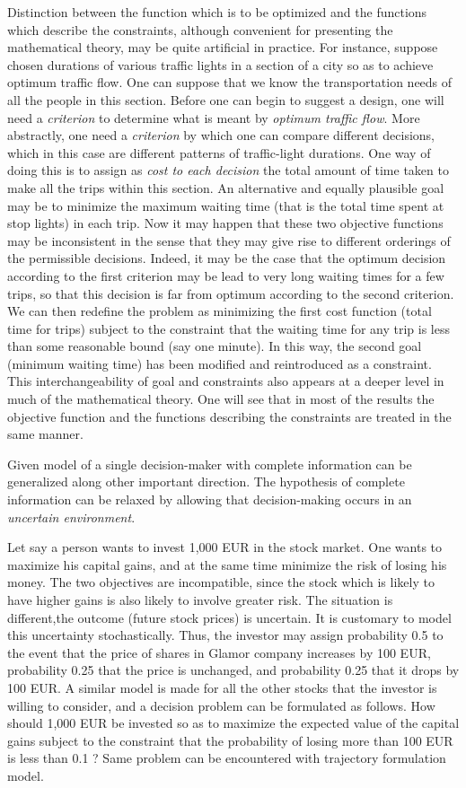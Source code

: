 \noindent Distinction between the function which is to be optimized and the functions which describe the constraints, although convenient for presenting the mathematical theory, may be quite artificial in practice. For instance, suppose chosen durations of various traffic lights in a section of a city so as to achieve optimum traffic flow. One can suppose that we know the transportation needs of all the people in this section. Before one can begin to suggest a design, one will need a \textit{criterion} to determine what is meant by \textit{optimum traffic flow}. More abstractly, one need a \textit{criterion} by which one can compare different decisions, which in this case are different patterns of traffic-light durations. One way of doing this is to assign as \textit{cost to each decision} the total amount of time taken to make all the trips within this section. An alternative and equally plausible goal may be to minimize the maximum waiting time (that is the total time spent at stop lights) in each trip. Now it may happen that these two objective functions may be inconsistent in the sense that they may give rise to different orderings of the permissible decisions. Indeed, it may be the case that the optimum decision according to the first criterion may be lead to very long waiting times for a few trips, so that this decision is far from optimum according to the second criterion. We can then redefine the problem as minimizing the first cost function (total time for trips) subject to the constraint that the waiting time for any trip is less than some reasonable bound (say one minute). In this way, the second goal (minimum waiting time) has been modified and reintroduced as a constraint. This interchangeability of goal and constraints also appears at a deeper level in much of the mathematical theory. One will see that in most of the results the objective function and the functions describing the constraints are treated in the same manner.

Given model of a single decision-maker with complete information can be generalized along other important direction. The hypothesis of complete information can be relaxed by allowing that decision-making occurs in an \textit{uncertain environment}.

Let say a person wants to invest 1,000 EUR in the stock market. One wants to maximize his capital gains, and at the same time minimize the risk of losing his money. The two objectives are incompatible, since the stock which is likely to have higher gains is also likely to involve greater risk. The situation is different,the outcome (future stock prices) is uncertain. It is customary to model this uncertainty stochastically. Thus, the investor may assign probability 0.5 to the event that the price of shares in Glamor company increases by 100 EUR, probability 0.25 that the price is unchanged, and probability 0.25 that it drops by 100 EUR. A similar model is made for all the other stocks that the investor is willing to consider, and a decision problem can be formulated as follows. How should 1,000 EUR be invested so as to maximize the expected value of the capital gains subject to the constraint that the probability of losing more than 100 EUR is less than 0.1 ? Same problem can be encountered with trajectory formulation model.

